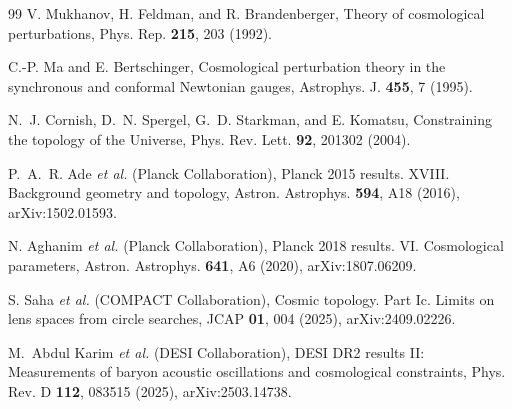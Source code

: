 \documentclass[
  aps,
  prd,
  reprint,
  superscriptaddress,
  floatfix,
  nofootinbib,
  longbibliography
]{revtex4-2}
\theoremstyle{plain}
\theoremstyle{definition}
\theoremstyle{remark}
\begin{document}
\begin{thebibliography}{99}
V. Mukhanov, H. Feldman, and R. Brandenberger,
Theory of cosmological perturbations,
Phys. Rep. \textbf{215}, 203 (1992).

C.-P. Ma and E. Bertschinger,
Cosmological perturbation theory in the synchronous and conformal Newtonian gauges,
Astrophys. J. \textbf{455}, 7 (1995).

N.~J. Cornish, D.~N. Spergel, G.~D. Starkman, and E. Komatsu,
Constraining the topology of the Universe,
Phys. Rev. Lett. \textbf{92}, 201302 (2004).

P.~A.~R. Ade \emph{et al.} (Planck Collaboration),
Planck 2015 results. XVIII. Background geometry and topology,
Astron. Astrophys. \textbf{594}, A18 (2016), arXiv:1502.01593.

N. Aghanim \emph{et al.} (Planck Collaboration),
Planck 2018 results. VI. Cosmological parameters,
Astron. Astrophys. \textbf{641}, A6 (2020), arXiv:1807.06209.

S. Saha \emph{et al.} (COMPACT Collaboration),
Cosmic topology. Part Ic. Limits on lens spaces from circle searches,
JCAP \textbf{01}, 004 (2025), arXiv:2409.02226.

M.~Abdul Karim \emph{et al.} (DESI Collaboration),
DESI DR2 results II: Measurements of baryon acoustic oscillations and cosmological constraints,
Phys. Rev. D \textbf{112}, 083515 (2025), arXiv:2503.14738.

\end{thebibliography}
\end{document}
